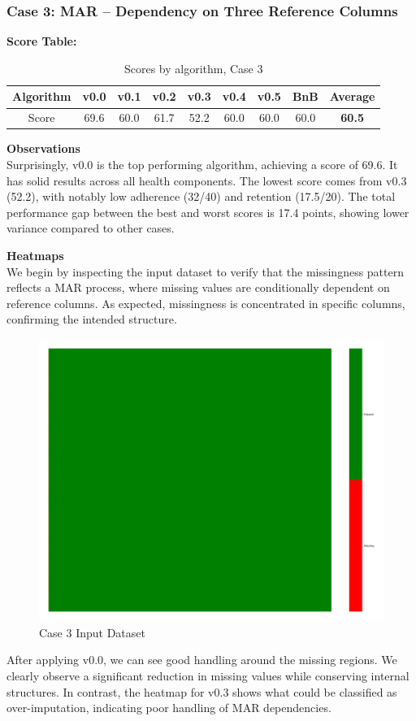 \documentclass[a4paper,12pt]{article}
\begin{document}
\subsubsection{Case 3: MAR – Dependency on Three Reference Columns}

\textbf{Score Table:}

\begin{table}[H]
\centering
\caption{Scores by algorithm, Case 3}
\label{tab:score_algorithms_case3_new}
\begin{tabular}{|c|c|c|c|c|c|c|c|c|}
\hline
Algorithm & v0.0 & v0.1 & v0.2 & v0.3 & v0.4 & v0.5 & BnB & Average \\
\hline
Score & 69.6 & 60.0 & 61.7 & 52.2 & 60.0 & 60.0 & 60.0 & \textbf{60.5} \\
\hline
\end{tabular}
\end{table}

\textbf{Observations}\\
Surprisingly, v0.0 is the top performing algorithm, achieving a score of 69.6. It has solid results across all health components. The lowest score comes from v0.3 (52.2), with notably low adherence (32/40) and retention (17.5/20). The total performance gap between the best and worst scores is 17.4 points, showing lower variance compared to other cases. 

\textbf{Heatmaps}\\
We begin by inspecting the input dataset to verify that the missingness pattern reflects a MAR process, where missing values are conditionally dependent on reference columns. As expected, missingness is concentrated in specific columns, confirming the intended structure.

\begin{figure}[H]
    \centering
    \includegraphics[width=0.5\linewidth]{case3_heatmap_erased.png}
    \caption{Case 3 Input Dataset}
\end{figure}

After applying v0.0, we can see good handling around the missing regions. We clearly observe a significant reduction in missing values while conserving internal structures. In contrast, the heatmap for v0.3 shows what could be classified as over-imputation, indicating poor handling of MAR dependencies.
\end{document}
